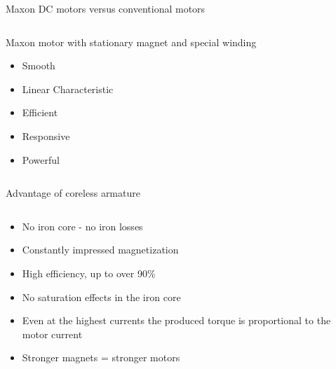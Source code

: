 \documentclass[compress]{beamer}
\begin{document}
\begin{frame}{Maxon DC motors versus conventional motors}
\begin{columns}
\begin{column}{0.5\linewidth}
Maxon motor with stationary magnet and special winding

\begin{itemize}
\item Smooth
\item Linear Characteristic
\item Efficient
\item Responsive
\item Powerful
\end{itemize}

        \end{column}
    \end{columns}

\end{frame}

\begin{frame}{Advantage of coreless armature}

\begin{columns}
    \begin{column}{0.6\linewidth}

\begin{itemize}

\item No iron core - no iron losses
\item Constantly impressed magnetization
\item High efficiency, up to over 90\%
\item No saturation effects in the iron core
\item Even at the highest currents the produced torque is proportional to
  the motor current
\item Stronger magnets = stronger motors
\end{itemize}

    \end{column}
    \begin{column}{0.4\linewidth}


\end{column}
\end{columns}
\end{frame}
\end{document}
